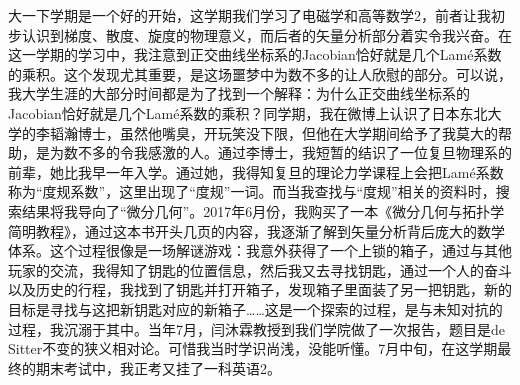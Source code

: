 	    大一下学期是一个好的开始，这学期我们学习了电磁学和高等数学2，前者让我初步认识到梯度、散度、旋度的物理意义，而后者的矢量分析部分着实令我兴奋。在这一学期的学习中，我注意到正交曲线坐标系的Jacobian恰好就是几个Lamé系数的乘积。这个发现尤其重要，是这场噩梦中为数不多的让人欣慰的部分。可以说，我大学生涯的大部分时间都是为了找到一个解释：为什么正交曲线坐标系的Jacobian恰好就是几个Lamé系数的乘积？同学期，我在微博上认识了日本东北大学的李韬瀚博士，虽然他嘴臭，开玩笑没下限，但他在大学期间给予了我莫大的帮助，是为数不多的令我感激的人。通过李博士，我短暂的结识了一位复旦物理系的前辈，她比我早一年入学。通过她，我得知复旦的理论力学课程上会把Lamé系数称为“度规系数”，这里出现了“度规”一词。而当我查找与“度规”相关的资料时，搜索结果将我导向了“微分几何”。2017年6月份，我购买了一本《微分几何与拓扑学简明教程》，通过这本书开头几页的内容，我逐渐了解到矢量分析背后庞大的数学体系。这个过程很像是一场解谜游戏：我意外获得了一个上锁的箱子，通过与其他玩家的交流，我得知了钥匙的位置信息，然后我又去寻找钥匙，通过一个人的奋斗以及历史的行程，我找到了钥匙并打开箱子，发现箱子里面装了另一把钥匙，新的目标是寻找与这把新钥匙对应的新箱子……这是一个探索的过程，是与未知对抗的过程，我沉溺于其中。当年7月，闫沐霖教授到我们学院做了一次报告，题目是de Sitter不变的狭义相对论。可惜我当时学识尚浅，没能听懂。7月中旬，在这学期最终的期末考试中，我正考又挂了一科英语2。

